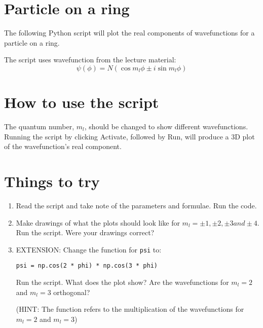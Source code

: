\documentclass{article}
\begin{document}
\section{Particle on a ring}

The following Python script will plot the real components of wavefunctions for a particle on a ring. \par\medskip 
\noindent The script uses wavefunction from the lecture material:
\[\psi (\phi) = N(\cos m_l \phi \pm i \sin m_l \phi) \]

\section{How to use the script}
The quantum number, $m_l$, should be changed to show different wavefunctions. Running the script by clicking Activate, followed by Run, will produce a 3D plot of the wavefunction's real component.

\section{Things to try}
\begin{enumerate}
\item Read the script and take note of the parameters and formulae. Run the code.
\item Make drawings of what the plots should look like for $m_l=\pm 1, \pm 2, \pm 3 and \pm 4$. Run the script. Were your drawings correct? 
\item EXTENSION: Change the function for \texttt{psi} to: \par\texttt{psi = np.cos(2 * phi) * np.cos(3 * phi)}\par Run the script. What does the plot show? Are the wavefunctions for $m_l = 2$ and $m_l = 3$ orthogonal? 

(HINT: The function refers to the multiplication of the wavefunctions for $m_l = 2$ and $m_l = 3$)
\end{enumerate}
\end{document}
